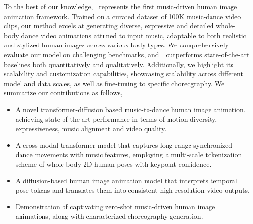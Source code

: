 To the best of our knowledge, \papername~represents the first music-driven human image animation framework.
Trained on a curated dataset of 100K music-dance video clips, our method excels at generating diverse, expressive and detailed whole-body dance video animations attuned to input music, adaptable to both realistic and stylized human images across various body types. We comprehensively evaluate our model on challenging benchmarks, and~\papername~outperforms state-of-the-art 
baselines both quantitatively and qualitatively. Additionally, we highlight its scalability and customization capabilities, showcasing scalability across different model and data scales, as well as fine-tuning to specific choreography.  We summarize our contributions as follows,
\begin{itemize}[nolistsep,leftmargin=*]
\item A novel transformer-diffusion based music-to-dance human image animation, achieving state-of-the-art performance in terms of motion diversity, expressiveness, music alignment and video quality.

\item A cross-modal transformer model that captures long-range synchronized dance movements with music features, employing  a multi-scale tokenization scheme of whole-body 2D human poses with keypoint confidence. 

\item A diffusion-based human image animation model that interprets temporal pose tokens and translates them into consistent high-resolution video outputs.

\item Demonstration of captivating zero-shot music-driven human image animations, along with characterized choreography generation.  
\end{itemize}

